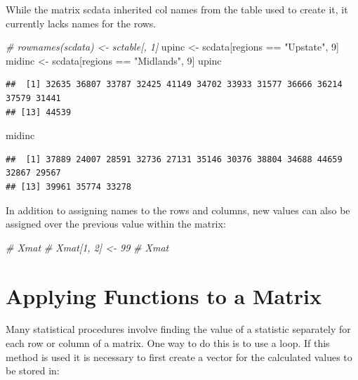 \documentclass[
]{book}
\newenvironment{Shaded}{\begin{snugshade}}{\end{snugshade}}
\newcommand{\CommentTok}[1]{\textcolor[rgb]{0.56,0.35,0.01}{\textit{#1}}}
\newcommand{\DecValTok}[1]{\textcolor[rgb]{0.00,0.00,0.81}{#1}}
\newcommand{\NormalTok}[1]{#1}
\newcommand{\OtherTok}[1]{\textcolor[rgb]{0.56,0.35,0.01}{#1}}
\newcommand{\SpecialCharTok}[1]{\textcolor[rgb]{0.00,0.00,0.00}{#1}}
\newcommand{\StringTok}[1]{\textcolor[rgb]{0.31,0.60,0.02}{#1}}
\begin{document}
While the matrix scdata inherited col names from the table used to create it, it currently lacks names for the rows.

\begin{Shaded}
\begin{Highlighting}[]
\CommentTok{\# rownames(scdata) \textless{}{-} sctable[, 1]}
\NormalTok{upinc }\OtherTok{\textless{}{-}}\NormalTok{ scdata[regions }\SpecialCharTok{==} \StringTok{"Upstate"}\NormalTok{, }\DecValTok{9}\NormalTok{]}
\NormalTok{midinc }\OtherTok{\textless{}{-}}\NormalTok{ scdata[regions }\SpecialCharTok{==} \StringTok{"Midlands"}\NormalTok{, }\DecValTok{9}\NormalTok{]}
\NormalTok{upinc}
\end{Highlighting}
\end{Shaded}

\begin{verbatim}
##  [1] 32635 36807 33787 32425 41149 34702 33933 31577 36666 36214 37579 31441
## [13] 44539
\end{verbatim}

\begin{Shaded}
\begin{Highlighting}[]
\NormalTok{midinc}
\end{Highlighting}
\end{Shaded}

\begin{verbatim}
##  [1] 37889 24007 28591 32736 27131 35146 30376 38804 34688 44659 32867 29567
## [13] 39961 35774 33278
\end{verbatim}

In addition to assigning names to the rows and columns, new values can also be assigned over the previous value within the matrix:

\begin{Shaded}
\begin{Highlighting}[]
\CommentTok{\# Xmat}
\CommentTok{\# Xmat[1, 2] \textless{}{-} 99}
\CommentTok{\# Xmat}
\end{Highlighting}
\end{Shaded}

\hypertarget{applying-functions-to-a-matrix}{%
\section{Applying Functions to a Matrix}\label{applying-functions-to-a-matrix}}

Many statistical procedures involve finding the value of a statistic separately for each row or column of a matrix. One way to do this is to use a loop. If this method is used it is necessary to first create a vector for the calculated values to be stored in:
\end{document}
